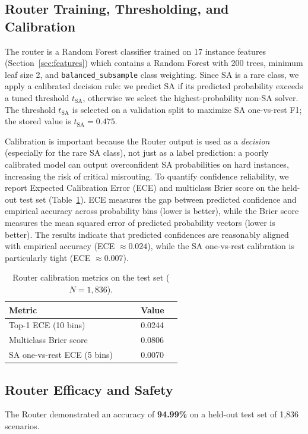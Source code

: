 \documentclass[conference]{IEEEtran}
\begin{document}
\subsection{Router Training, Thresholding, and Calibration}
\label{sec:router_calibration}
The router is a Random Forest classifier trained on 17 instance features (Section~\ref{sec:features}) which contains a Random Forest with 200 trees, minimum leaf size 2, and \texttt{balanced\_subsample} class weighting. Since SA is a rare class, we apply a calibrated decision rule: we predict SA if its predicted probability exceeds a tuned threshold $t_{\text{SA}}$, otherwise we select the highest-probability non-SA solver. The threshold $t_{\text{SA}}$ is selected on a validation split to maximize SA one-vs-rest F1; the stored value is $t_{\text{SA}}=0.475$.

Calibration is important because the Router output is used as a \emph{decision} (especially for the rare SA class), not just as a label prediction: a poorly calibrated model can output overconfident SA probabilities on hard instances, increasing the risk of critical misrouting. To quantify confidence reliability, we report Expected Calibration Error (ECE) and multiclass Brier score on the held-out test set (Table~\ref{tab:router_calibration_metrics}). ECE measures the gap between predicted confidence and empirical accuracy across probability bins (lower is better), while the Brier score measures the mean squared error of predicted probability vectors (lower is better). The results indicate that predicted confidences are reasonably aligned with empirical accuracy (ECE $\approx 0.024$), while the SA one-vs-rest calibration is particularly tight (ECE $\approx 0.007$).

\begin{table}[t]
\centering
\caption{Router calibration metrics on the test set ($N=1{,}836$).}
\label{tab:router_calibration_metrics}
\begin{tabular}{p{0.65\linewidth} p{0.2\linewidth}}
\toprule
\textbf{Metric} & \textbf{Value} \\
\midrule
Top-1 ECE (10 bins) & 0.0244 \\
Multiclass Brier score & 0.0806 \\
SA one-vs-rest ECE (5 bins) & 0.0070 \\
\bottomrule
\end{tabular}
\end{table}


\subsection{Router Efficacy and Safety}
The Router demonstrated an accuracy of \textbf{94.99\%} on a held-out test set of 1,836 scenarios. 
\end{document}
